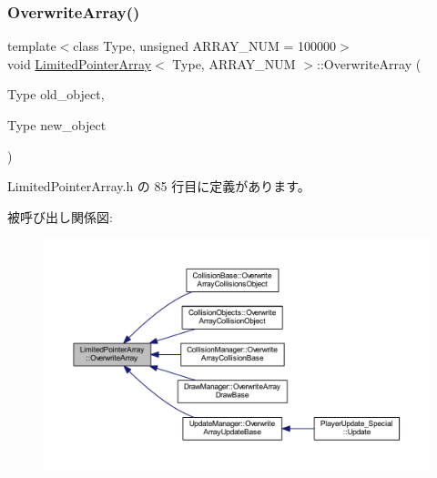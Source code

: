 \subsubsection{\texorpdfstring{Overwrite\+Array()}{OverwriteArray()}}
{\footnotesize\ttfamily template$<$class Type, unsigned A\+R\+R\+A\+Y\+\_\+\+N\+UM = 100000$>$ \\
void \mbox{\hyperlink{class_limited_pointer_array}{Limited\+Pointer\+Array}}$<$ Type, A\+R\+R\+A\+Y\+\_\+\+N\+UM $>$\+::Overwrite\+Array (\begin{DoxyParamCaption}\item[{Type}]{old\+\_\+object,  }\item[{Type}]{new\+\_\+object }\end{DoxyParamCaption})\hspace{0.3cm}{\ttfamily [inline]}}



 Limited\+Pointer\+Array.\+h の 85 行目に定義があります。

被呼び出し関係図\+:\nopagebreak
\begin{figure}[H]
\begin{center}
\leavevmode
\includegraphics[width=350pt]{class_limited_pointer_array_a7cf64a1731ab6d0d63182b6c223fae0b_icgraph}
\end{center}
\end{figure}
\mbox{\label{class_limited_pointer_array_a6c46bb77df04a9e1226025f8c48e26cb}} 
